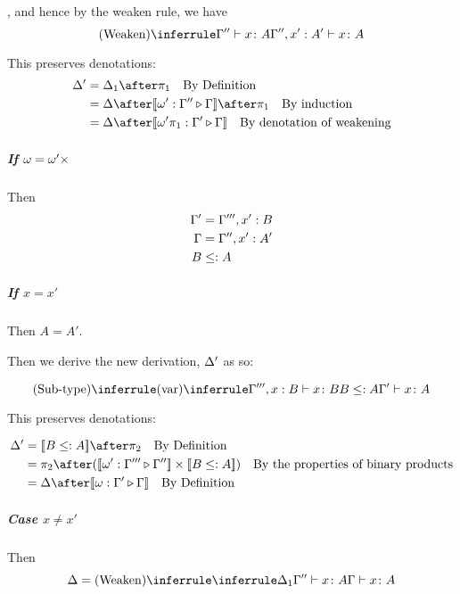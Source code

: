 {        , and hence by the weaken rule, we have 
        \begin{equation}
            \ntreeruleI{Weaken}{\typerelation{\G''}{x}{A}}{\typerelation{\G'', x':A' }{x}{A}}
        \end{equation}
    
        This preserves denotations:
        \begin{align}
            \D' & = \D_1\after\p\qt{By Definition} \\
            & = \D\after\deno{\wrel{\w'}{\G''}{\G}}\after\p\qt{By induction}\\
            & = \D\after\deno{\wrel{\w'\p}{\G'}{\G}}\qt{By denotation of weakening}
        \end{align}
    
        \subparagraph{If $\omega = \omega'\times$} 
        Then 
        \begin{align}
            \Gamma' & = \Gamma''', x': B\\
            \Gamma &= \Gamma'', x': A'\\
            B & \leq: A
        \end{align}
    
        \subparagraph{If $x = x'$}
    
        Then $A = A'$.
    
        Then we derive the new derivation, $\Delta'$ as so:
    
        \begin{equation}
            \ntreeruleII{Sub-type}{
                \ntreeruleI{var}{}{\typerelation{\G''', x: B}{x}{B}}
                }{
                B \subtype A
            }{
                \typerelation{\G'}{x}{A}
            }
        \end{equation}
    
        This preserves denotations:
    
        \begin{align}
            \D' & = \deno{B\subtype A}\after\pp\qt{By Definition} \\
             & = \pp\after (\deno{\wrel{\w'}{\G'''}{\G''}}\times \deno{B\subtype A}) \qt{By the properties of binary products}\\
             & = \D\after\deno{\wrel{\w}{\G'}{\G}}\qt{By Definition}
        \end{align}
    
        \subparagraph{Case $x \neq x'$}
        Then 
        \begin{equation}
            \D = \ntreeruleI{Weaken}{\treeruleI{\D_1}{\typerelation{\G''}{x}{A}}}{\gtyperelation{x}{A}}
        \end{equation}
    
}
